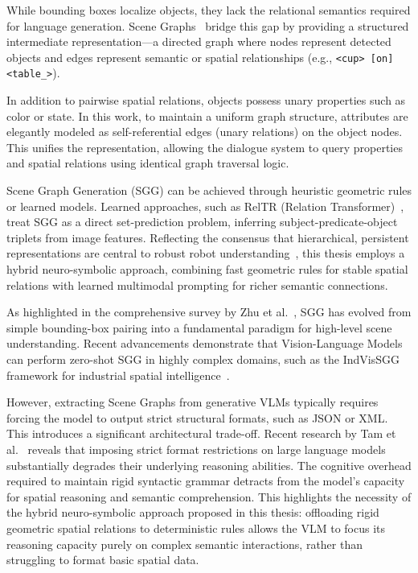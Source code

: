 While bounding boxes localize objects, they lack the relational semantics required for language generation. Scene Graphs~\cite{johnson_image_2015} bridge this gap by providing a structured intermediate representation---a directed graph where nodes represent detected objects and edges represent semantic or spatial relationships (e.g., \verb|<cup> [on] <table_>|).

In addition to pairwise spatial relations, objects possess unary properties such as color or state. In this work, to maintain a uniform graph structure, attributes are elegantly modeled as self-referential edges (unary relations) on the object nodes. This unifies the representation, allowing the dialogue system to query properties and spatial relations using identical graph traversal logic.

Scene Graph Generation (SGG) can be achieved through heuristic geometric rules or learned models. Learned approaches, such as RelTR (Relation Transformer)~\cite{cong_reltr_2023}, treat SGG as a direct set-prediction problem, inferring subject-predicate-object triplets from image features. Reflecting the consensus that hierarchical, persistent representations are central to robust robot understanding~\cite{mascaro_scene_2025, hughes_foundations_2024}, this thesis employs a hybrid neuro-symbolic approach, combining fast geometric rules for stable spatial relations with learned multimodal prompting for richer semantic connections.

As highlighted in the comprehensive survey by Zhu et al.~\cite{zhu_scene_2022}, SGG has evolved from simple bounding-box pairing into a fundamental paradigm for high-level scene understanding. Recent advancements demonstrate that Vision-Language Models can perform zero-shot SGG in highly complex domains, such as the IndVisSGG framework for industrial spatial intelligence~\cite{wang_indvissgg_2025}.

However, extracting Scene Graphs from generative VLMs typically requires forcing the model to output strict structural formats, such as JSON or XML. This introduces a significant architectural trade-off. Recent research by Tam et al.~\cite{tam_let_2024} reveals that imposing strict format restrictions on large language models substantially degrades their underlying reasoning abilities. The cognitive overhead required to maintain rigid syntactic grammar detracts from the model's capacity for spatial reasoning and semantic comprehension. This highlights the necessity of the hybrid neuro-symbolic approach proposed in this thesis: offloading rigid geometric spatial relations to deterministic rules allows the VLM to focus its reasoning capacity purely on complex semantic interactions, rather than struggling to format basic spatial data.


